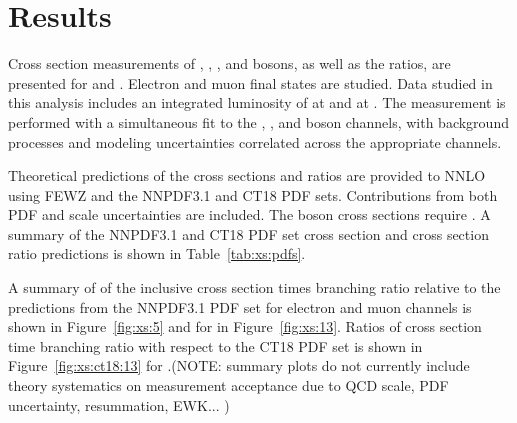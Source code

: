 \chapter{Results}\label{ch:results}
Cross section measurements of \Wp, \Wm, \W, and \Z bosons, as well as the ratios, are presented for \sg and \sh. Electron and muon final states are studied. Data studied in this analysis includes an integrated luminosity of \lumig at \sg and \lumih at \sh. The measurement is performed with a simultaneous fit to the \Wp, \Wm, and \Z boson channels, with background processes and modeling uncertainties correlated across the appropriate channels. 

Theoretical predictions of the cross sections and ratios are provided to NNLO using FEWZ and the NNPDF3.1 and CT18 PDF sets. Contributions from both PDF and scale uncertainties are included. The \Z boson cross sections require \masswindow. A summary of the NNPDF3.1 and CT18 PDF set cross section and cross section ratio predictions is shown in Table~\ref{tab:xs:pdfs}.

A summary of of the inclusive cross section times branching ratio relative to the predictions from the NNPDF3.1 PDF set for \sg electron and muon channels is shown in Figure~\ref{fig:xs:5} and for \sh in Figure~\ref{fig:xs:13}. Ratios of cross section time branching ratio with respect to the CT18 PDF set is shown in Figure~\ref{fig:xs:ct18:13} for \sh.(NOTE: summary plots do not currently include theory systematics on measurement acceptance due to QCD scale, PDF uncertainty, resummation, EWK... )








%

% 
% 


